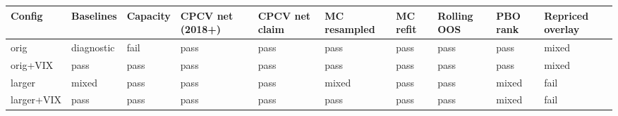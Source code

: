 \begin{tabular}{llllllllll}
\toprule
Config & Baselines & Capacity & CPCV net (2018+) & CPCV net claim & MC resampled & MC refit & Rolling OOS & PBO rank & Repriced overlay \\
\midrule
orig & diagnostic & fail & pass & pass & pass & pass & pass & pass & mixed \\
orig+VIX & pass & pass & pass & pass & pass & pass & pass & pass & mixed \\
larger & mixed & pass & pass & pass & mixed & pass & pass & mixed & fail \\
larger+VIX & pass & pass & pass & pass & pass & pass & pass & mixed & fail \\
\bottomrule
\end{tabular}
